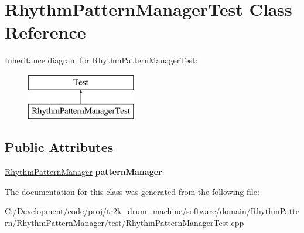 \hypertarget{class_rhythm_pattern_manager_test}{}\section{Rhythm\+Pattern\+Manager\+Test Class Reference}
\label{class_rhythm_pattern_manager_test}
Inheritance diagram for Rhythm\+Pattern\+Manager\+Test\+:\begin{figure}[H]
\begin{center}
\leavevmode
\includegraphics[height=2.000000cm]{class_rhythm_pattern_manager_test}
\end{center}
\end{figure}
\subsection*{Public Attributes}
\begin{DoxyCompactItemize}
\item 
\mbox{\label{class_rhythm_pattern_manager_test_a6ed7f9cb34b49d4ded40529ed0c6e2b6}} 
\mbox{\hyperlink{class_rhythm_pattern_manager}{Rhythm\+Pattern\+Manager}} {\bfseries pattern\+Manager}
\end{DoxyCompactItemize}


The documentation for this class was generated from the following file\+:\begin{DoxyCompactItemize}
\item 
C\+:/\+Development/code/proj/tr2k\+\_\+drum\+\_\+machine/software/domain/\+Rhythm\+Pattern/\+Rhythm\+Pattern\+Manager/test/Rhythm\+Pattern\+Manager\+Test.\+cpp\end{DoxyCompactItemize}
